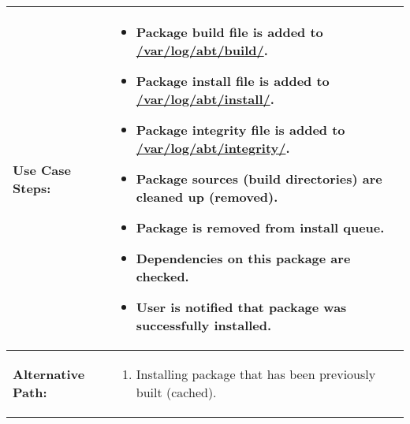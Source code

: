 \begin{tabularx}{\linewidth}{|l|X|}
\hline
\textbf{Use Case Steps:} & 
\begin{minipage}{\linewidth}
  \vspace{0.05em}
  \begin{itemize}
    \item Package build file is added to \url{/var/log/abt/build/}.
    \item Package install file is added to \url{/var/log/abt/install/}.
    \item Package integrity file is added to \url{/var/log/abt/integrity/}.
    \item Package sources (build directories) are cleaned up (removed).
    \item Package is removed from install queue.
    \item Dependencies on this package are checked.
    \item User is notified that package was successfully installed.
  \end{itemize}
  \vspace{0.05em}
\end{minipage}
\\
\hline 
\textbf{Alternative Path:} &
\begin{minipage}{\linewidth}
  \vspace{0.05em} 
  \begin{enumerate}
    \item Installing package that has been previously built (cached).
  \end{enumerate}
  \vspace{0.05em} 
\end{minipage}
\\
\hline
\end{tabularx}

\newpage



